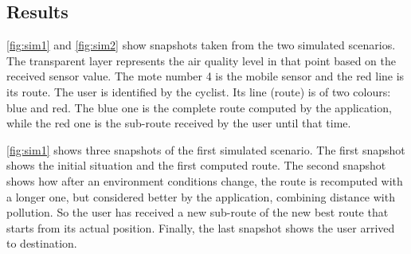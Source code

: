 \subsection*{Results}

\autoref{fig:sim1} and \autoref{fig:sim2} show snapshots taken from the two simulated scenarios.
The transparent layer represents the air quality level in that point based on the received sensor value.
The mote number 4 is the mobile sensor and the red line is its route.
The user is identified by the cyclist. 
Its line (route) is of two colours: blue and red.
The blue one is the complete route computed by the application, while the red one is the sub-route received by the user until that time. 

\autoref{fig:sim1} shows three snapshots of the first simulated scenario.
The first snapshot shows the initial situation and the first computed route.
The second snapshot shows how after an environment conditions change, the route is recomputed with a longer one, but considered better by the application, combining distance with pollution. 
So the user has received a new sub-route of the new best route that starts from its actual position.
Finally, the last snapshot shows the user arrived to destination.
% 
